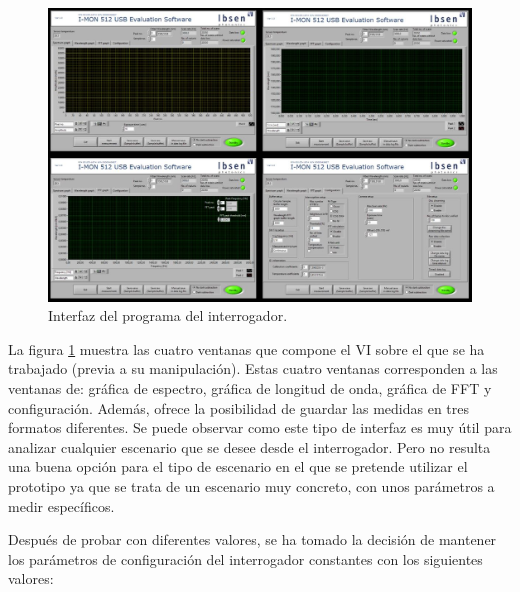 \begin{itemize} [label=]
	\begin{figure}[H]
		\centering
		\includegraphics[width=1\textwidth]{./img/softwareInterrogador2}
		\caption{Interfaz del programa del interrogador.} 
		\label{fig:interrogadorPantalla}
	\end{figure}

	La figura \ref{fig:interrogadorPantalla} muestra las cuatro ventanas que compone el VI sobre el que se ha trabajado (previa a su manipulación). Estas cuatro ventanas corresponden a las ventanas de: gráfica de espectro, gráfica de longitud de onda, gráfica de FFT y configuración. Además, ofrece la posibilidad de guardar las medidas en tres formatos diferentes. Se puede observar como este tipo de interfaz es muy útil para analizar cualquier escenario que se desee desde el interrogador. Pero no resulta una buena opción para el tipo de escenario en el que se pretende utilizar el prototipo ya que se trata de un escenario muy concreto, con unos parámetros a medir específicos.
	
		Después de probar con diferentes valores, se ha tomado la decisión de mantener los parámetros de configuración del interrogador constantes con los siguientes valores:
	

\end{itemize}
